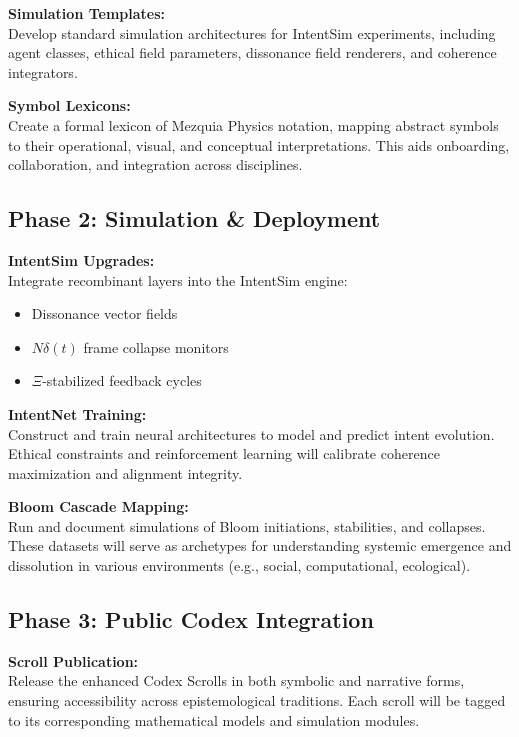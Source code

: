 \documentclass[12pt]{article}
\begin{document}
\textbf{Simulation Templates:} \\
Develop standard simulation architectures for IntentSim experiments, including agent classes, ethical field parameters, dissonance field renderers, and coherence integrators.

\textbf{Symbol Lexicons:} \\
Create a formal lexicon of Mezquia Physics notation, mapping abstract symbols to their operational, visual, and conceptual interpretations. This aids onboarding, collaboration, and integration across disciplines.

\subsection{Phase 2: Simulation \& Deployment}

\textbf{IntentSim Upgrades:} \\
Integrate recombinant layers into the IntentSim engine:
\begin{itemize}
  \item Dissonance vector fields
  \item \(N\delta(t)\) frame collapse monitors
  \item \(\Xi\)-stabilized feedback cycles
\end{itemize}

\textbf{IntentNet Training:} \\
Construct and train neural architectures to model and predict intent evolution. Ethical constraints and reinforcement learning will calibrate coherence maximization and alignment integrity.

\textbf{Bloom Cascade Mapping:} \\
Run and document simulations of Bloom initiations, stabilities, and collapses. These datasets will serve as archetypes for understanding systemic emergence and dissolution in various environments (e.g., social, computational, ecological).

\subsection{Phase 3: Public Codex Integration}

\textbf{Scroll Publication:} \\
Release the enhanced Codex Scrolls in both symbolic and narrative forms, ensuring accessibility across epistemological traditions. Each scroll will be tagged to its corresponding mathematical models and simulation modules.
\end{document}
